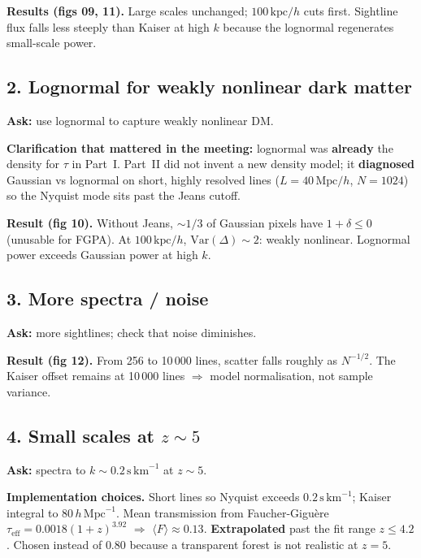 \documentclass[11pt]{article}
\begin{document}
\textbf{Results (figs 09, 11).}
Large scales unchanged; $100\,\mathrm{kpc}/h$ cuts first.
Sightline flux falls less steeply than Kaiser at high $k$ because the lognormal regenerates small-scale power.

\subsection{2. Lognormal for weakly nonlinear dark matter}

\textbf{Ask:} use lognormal to capture weakly nonlinear DM.

\textbf{Clarification that mattered in the meeting:}
lognormal was \textbf{already} the density for $\tau$ in Part~I.
Part~II did not invent a new density model; it \textbf{diagnosed} Gaussian vs lognormal on short, highly resolved lines ($L=40\,\mathrm{Mpc}/h$, $N=1024$) so the Nyquist mode sits past the Jeans cutoff.

\textbf{Result (fig 10).}
Without Jeans, $\sim 1/3$ of Gaussian pixels have $1+\delta\le 0$ (unusable for FGPA).
At $100\,\mathrm{kpc}/h$, $\mathrm{Var}(\Delta)\sim 2$: weakly nonlinear.
Lognormal power exceeds Gaussian power at high $k$.

\subsection{3. More spectra / noise}

\textbf{Ask:} more sightlines; check that noise diminishes.

\textbf{Result (fig 12).}
From 256 to 10\,000 lines, scatter falls roughly as $N^{-1/2}$.
The Kaiser offset remains at 10\,000 lines $\Rightarrow$ model normalisation, not sample variance.

\subsection{4. Small scales at $z\sim 5$}

\textbf{Ask:} spectra to $k\sim 0.2\,\mathrm{s\,km}^{-1}$ at $z\sim 5$.

\textbf{Implementation choices.}
Short lines so Nyquist exceeds $0.2\,\mathrm{s\,km}^{-1}$; Kaiser integral to $80\,h\,\mathrm{Mpc}^{-1}$.
Mean transmission from Faucher-Gigu\`ere $\tau_\mathrm{eff}=0.0018(1+z)^{3.92}$ $\Rightarrow$ $\langle F\rangle\approx 0.13$.
\textbf{Extrapolated} past the fit range $z\le 4.2$.
Chosen instead of $0.80$ because a transparent forest is not realistic at $z=5$.
\end{document}
